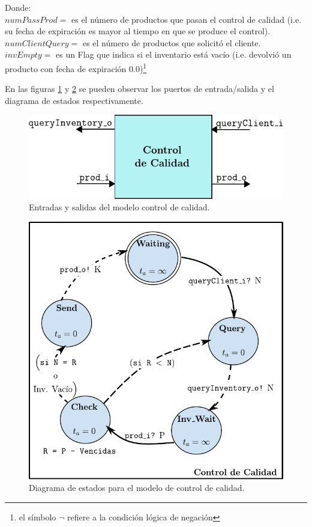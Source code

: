 \documentclass[10pt]{article}
\begin{document}
Donde:\\
$numPassProd = $ es el número de productos que pasan el control de calidad (i.e. su fecha de expiración es mayor al tiempo en que se produce el control).\\
$numClientQuery = $ es el número de productos que solicitó el cliente.\\
$invEmpty = $ es un Flag que indica si el inventario está vacío (i.e. devolvió un producto con fecha de expiración $0.0$)\footnote{el símbolo $\neg$ refiere a la condición lógica de negación}

En las figuras \ref{fig:CC-esquematico} y \ref{fig:CC-estados} se pueden observar los puertos de entrada/salida y el diagrama de estados respectivamente.

\begin{figure}[htbp]
	\centering
	\includegraphics{img/CC-esquematico}
	\caption{Entradas y salidas del modelo control de calidad.}
	\label{fig:CC-esquematico}
\end{figure}

\begin{figure}[htbp]
	\centering
	\includegraphics{img/controlCalidaddevsgraph}
	\caption{Diagrama de estados para el modelo de control de calidad.}
	\label{fig:CC-estados}
\end{figure}
\end{document}
